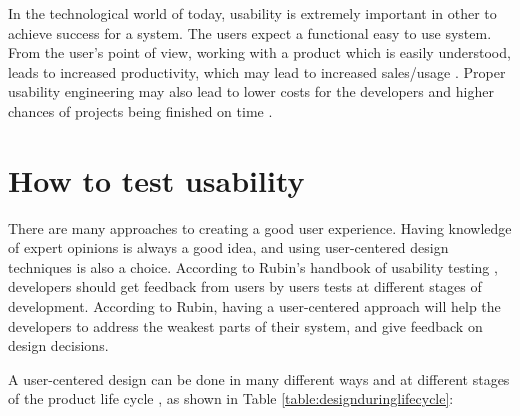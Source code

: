 In the technological world of today, usability is extremely important in other to achieve success for a system. The users expect a functional easy to use system. From the user's point of view, working with a product which is easily understood, leads to increased productivity, which may lead to increased sales/usage \cite{folmer2004architecting}.
Proper usability engineering may also lead to lower costs for the developers and higher chances of projects being finished on time \cite{nielsen1994usability}. 

\section{How to test usability}
\label{sec:howtotestusability}
There are many approaches to creating a good user experience. Having knowledge of expert opinions is always a good idea, and using user-centered design techniques is also a choice. According to Rubin's handbook of usability testing \cite{rubin2008handbook}, developers should get feedback from users by users tests at different stages of development. According to Rubin, having a user-centered approach will help the developers to address the weakest parts of their system, and give feedback on design decisions. 

A user-centered design can be done in many different ways and at different stages of the product life cycle \cite{abrasusercentereddesign}, as shown in Table \ref{table:designduringlifecycle}:

